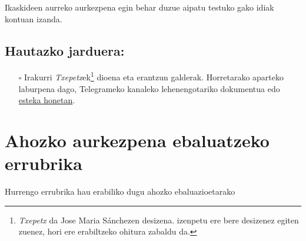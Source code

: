 \documentclass[
]{book}
\providecommand{\tightlist}{%
  \setlength{\itemsep}{0pt}\setlength{\parskip}{0pt}}
\begin{document}
Ikaskideen aurreko aurkezpena egin behar duzue aipatu testuko gako idiak kontuan izanda.

\hypertarget{hautazko-jarduera}{%
\section{Hautazko jarduera:}\label{hautazko-jarduera}}

\begin{itemize}
\tightlist
\item[$\square$]
  Irakurri \emph{Txepetx}ek\footnote{\emph{Txepetx} da Jose Maria Sánchezen desizena. izenpetu ere bere desizenez egiten zuenez, hori ere erabiltzeko ohitura zabaldu da.} dioena eta erantzun galderak. Horretarako aparteko laburpena dago, Telegrameko kanaleko lehenengotariko dokumentua edo \href{https://github.com/JuanAbasolo/HD/blob/01-gaia/1_Txepetx_testuak.pdf}{esteka honetan}.
\end{itemize}

\hypertarget{ahozko-aurkezpena-ebaluatzeko-errubrika}{%
\chapter*{Ahozko aurkezpena ebaluatzeko errubrika}\label{ahozko-aurkezpena-ebaluatzeko-errubrika}}

Hurrengo errubrika hau erabiliko dugu ahozko ebaluazioetarako
\end{document}
